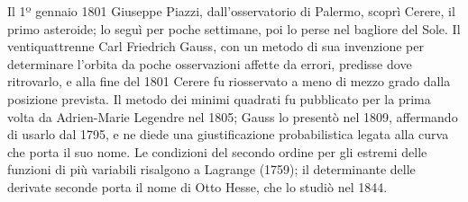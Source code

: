 \begin{notastorica}
Il 1º gennaio 1801 Giuseppe Piazzi, dall'osservatorio di Palermo, scoprì Cerere, il primo
asteroide; lo seguì per poche settimane, poi lo perse nel bagliore del Sole. Il
ventiquattrenne Carl Friedrich Gauss, con un metodo di sua invenzione per determinare
l'orbita da poche osservazioni affette da errori, predisse dove ritrovarlo, e alla fine
del 1801 Cerere fu riosservato a meno di mezzo grado dalla posizione prevista. Il metodo
dei minimi quadrati fu pubblicato per la prima volta da Adrien-Marie Legendre nel 1805;
Gauss lo presentò nel 1809, affermando di usarlo dal 1795, e ne diede una giustificazione
probabilistica legata alla curva che porta il suo nome. Le condizioni del secondo ordine
per gli estremi delle funzioni di più variabili risalgono a Lagrange (1759); il
determinante delle derivate seconde porta il nome di Otto Hesse, che lo studiò nel 1844.
\end{notastorica}
